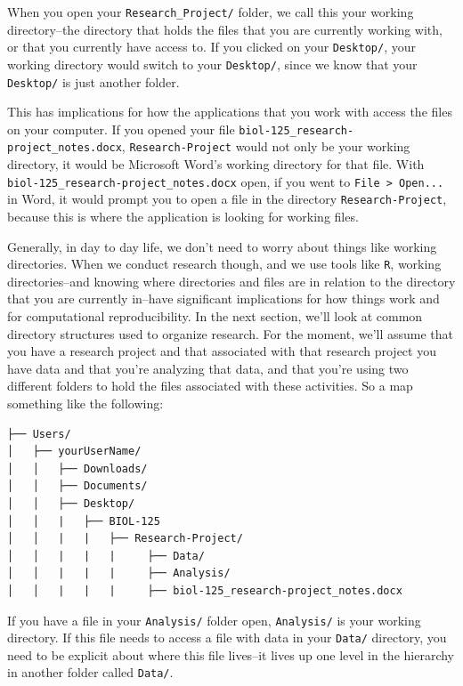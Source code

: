 \documentclass[
]{book}
\begin{document}
When you open your \texttt{Research\_Project/} folder, we call this your working directory--the directory that holds the files that you are currently working with, or that you currently have access to. If you clicked on your \texttt{Desktop/}, your working directory would switch to your \texttt{Desktop/}, since we know that your \texttt{Desktop/} is just another folder.

This has implications for how the applications that you work with access the files on your computer. If you opened your file \texttt{biol-125\_research-project\_notes.docx}, \texttt{Research-Project} would not only be your working directory, it would be Microsoft Word's working directory for that file. With \texttt{biol-125\_research-project\_notes.docx} open, if you went to \texttt{File\ \textgreater{}\ Open...} in Word, it would prompt you to open a file in the directory \texttt{Research-Project}, because this is where the application is looking for working files.

Generally, in day to day life, we don't need to worry about things like working directories. When we conduct research though, and we use tools like \texttt{R}, working directories--and knowing where directories and files are in relation to the directory that you are currently in--have significant implications for how things work and for computational reproducibility.
In the next section, we'll look at common directory structures used to organize research. For the moment, we'll assume that you have a research project and that associated with that research project you have data and that you're analyzing that data, and that you're using two different folders to hold the files associated with these activities. So a map something like the following:

\begin{verbatim}
├── Users/
│   ├── yourUserName/
│   │   ├── Downloads/
│   │   ├── Documents/
│   │   ├── Desktop/
│   │   |   ├── BIOL-125
│   │   |   |   ├── Research-Project/
│   │   |   |   |     ├── Data/
│   │   |   |   |     ├── Analysis/
│   │   |   |   |     ├── biol-125_research-project_notes.docx
\end{verbatim}

If you have a file in your \texttt{Analysis/} folder open, \texttt{Analysis/} is your working directory. If this file needs to access a file with data in your \texttt{Data/} directory, you need to be explicit about where this file lives--it lives up one level in the hierarchy in another folder called \texttt{Data/}.
\end{document}

